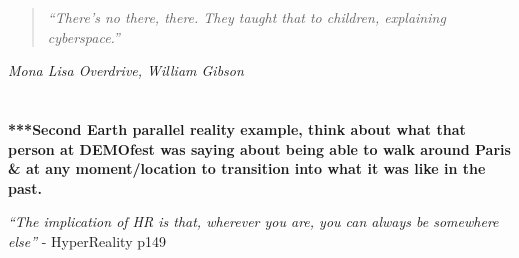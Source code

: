\begin{quote}
	\textit{``There's no there, there. They taught that to children, explaining cyberspace.''}
\end{quote}
\hfill \textit{Mona Lisa Overdrive, William Gibson}
\\
\\
\\





\textbf{***Second Earth parallel reality example, think about what that person at DEMOfest was saying about being able to walk around Paris \& at any moment/location to transition into what it was like in the past.}

\textit{``The implication of HR is that, wherever you are, you can always be somewhere else''} - HyperReality p149